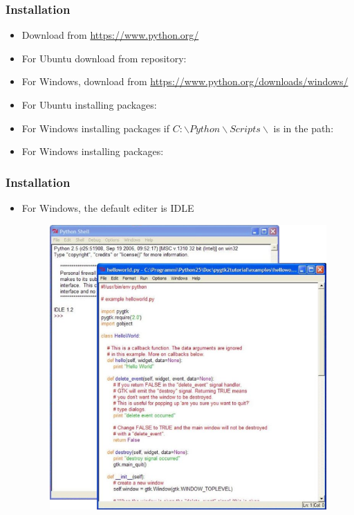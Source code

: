 \begin{frame}
\frametitle{Installation}
\begin{itemize}
\item Download from \url{https://www.python.org/}
\item For Ubuntu download from repository:

\item For Windows, download from \url{https://www.python.org/downloads/windows/}

\item For Ubuntu installing packages:

\item For Windows installing packages if $C:\backslash Python\backslash Scripts \backslash$ is in the path:

\item For Windows installing packages:
\end{itemize}
\end{frame}

\begin{frame}
\frametitle{Installation}
\begin{itemize}
\item For Windows, the default editer is IDLE
\begin{figure}
\includegraphics[width=0.8\linewidth, height=0.5\linewidth]{idle.png}
\end{figure}
\end{itemize}
\end{frame}

